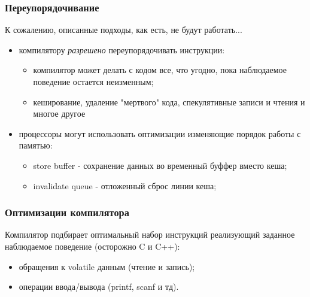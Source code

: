 \begin{frame}
\frametitle{Переупорядочивание}

К сожалению, описанные подходы, как есть, не будут работать...
\begin{itemize}
  \item<2-> компилятору \emph{разрешено} переупорядочивать инструкции:
        \begin{itemize}
          \item компилятор может делать с кодом все, что угодно, пока
                наблюдаемое поведение остается неизменным;
          \item кеширование, удаление "мертвого" кода, спекулятивные записи и
                чтения и многое другое
        \end{itemize}
  \item<3-> процессоры могут использовать оптимизации изменяющие порядок работы
        с памятью:
        \begin{itemize}
          \item store buffer - сохранение данных во временный буффер вместо
                кеша;
          \item invalidate queue - отложенный сброс линии кеша;
        \end{itemize}
\end{itemize}
\end{frame}

\begin{frame}
\frametitle{Оптимизации компилятора}

Компилятор подбирает оптимальный набор инструкций реализующий заданное
наблюдаемое поведение (осторожно C и C++):
\begin{itemize}
  \item обращения к volatile данным (чтение и запись);
  \item операции ввода/вывода (printf, scanf и тд).
\end{itemize}

\end{frame}

